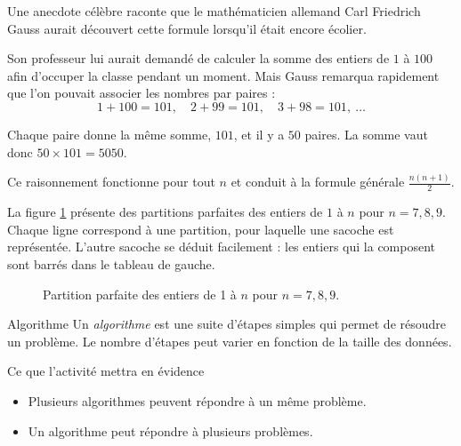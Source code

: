 \documentclass[a4paper,twoside]{article}
\begin{document}
Une anecdote célèbre raconte que le mathématicien allemand
Carl Friedrich Gauss aurait découvert cette formule lorsqu'il
était encore écolier.

Son professeur lui aurait demandé de calculer la somme des entiers
de $1$ à $100$ afin d'occuper la classe pendant un moment.
Mais Gauss remarqua rapidement que l'on pouvait associer les
nombres par paires :
$$1 + 100 = 101,\quad 2 + 99 = 101,\quad 3 + 98 = 101,\ \dots$$

Chaque paire donne la même somme, $101$, et il y a $50$ paires.
La somme vaut donc $50 \times 101 = 5050.$

Ce raisonnement fonctionne pour tout $n$ et conduit à la formule générale $\frac{n(n+1)}{2}$.


\begin{solution}
  La figure \ref{fig:part79} présente des partitions parfaites des entiers de $1$ à $n$ pour $n = 7, 8, 9$.
  Chaque ligne correspond à une partition, pour laquelle une sacoche est représentée.
  L'autre sacoche se déduit facilement : les entiers qui la composent sont barrés dans le tableau de gauche.
\end{solution}
\begin{figure}[htbp]
  \centering
  \caption{Partition parfaite des entiers de 1 à $n$ pour $n = 7, 8, 9$.}
  \label{fig:part79}
\end{figure}


\begin{definition}{Algorithme}
  Un \emph{algorithme} est une suite d'étapes simples qui permet de résoudre un problème.
  Le nombre d'étapes peut varier en fonction de la taille des données.
\end{definition}


\begin{remarque}{Ce que l'activité mettra en évidence}
  \begin{itemize}
  \item Plusieurs algorithmes peuvent répondre à un même problème.
  \item Un algorithme peut répondre à plusieurs problèmes.
  \end{itemize}
\end{remarque}
\end{document}
